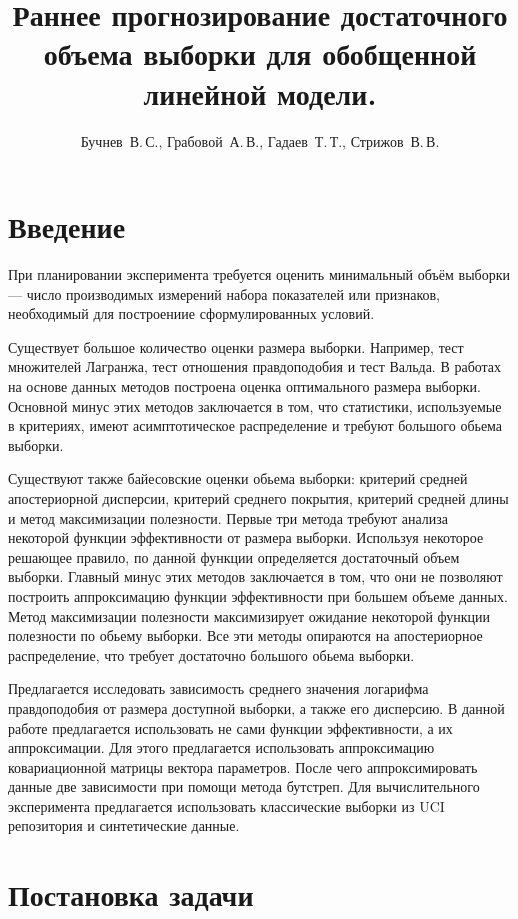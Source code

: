 \documentclass[12pt,twoside]{article}
\title
    {Раннее прогнозирование достаточного объема выборки для обобщенной линейной модели.}
\author
    {Бучнев~В.\,С., Грабовой~А.\,В., Гадаев~Т.\,Т., Стрижов~В.\,В.} %
\begin{document}
\maketitle

\section{Введение}
При планировании эксперимента требуется оценить минимальный объём выборки — число производимых измерений набора показателей или признаков, необходимый для построениие сформулированных условий. 

Существует большое количество оценки размера выборки. Например, тест множителей Лагранжа, тест отношения правдоподобия и тест Вальда. В работах \cite{Self-Mauritsen-1998, Shieh-2000, Shieh-2005} на основе данных методов построена оценка оптимального размера выборки. Основной минус этих методов заключается в том, что статистики, используемые в критериях, имеют асимптотическое распределение и требуют большого обьема выборки.

Существуют также байесовские оценки обьема выборки: критерий средней апостериорной дисперсии, критерий среднего покрытия, критерий средней длины и метод максимизации полезности. Первые три метода требуют анализа некоторой функции эффективности от размера выборки. Используя некоторое решающее правило, по данной функции определяется достаточный объем выборки. Главный минус этих методов заключается в том, что они не позволяют построить аппроксимацию функции эффективности при большем объеме данных. Метод максимизации полезности максимизирует ожидание некоторой функции полезности по обьему выборки. Все эти методы опираются на апостериорное распределение, что требует достаточно большого обьема выборки.

Предлагается исследовать зависимость среднего значения логарифма правдоподобия от размера доступной выборки, а также его дисперсию. В данной работе предлагается использовать не сами функции эффективности, а их аппроксимации. Для этого предлагается использовать аппроксимацию ковариационной матрицы вектора параметров. После чего аппроксимировать данные две зависимости при помощи метода бутстреп. Для вычислительного эксперимента предлагается использовать классические выборки из UCI репозитория и синтетические данные.

\section{Постановка задачи}
\end{document}
